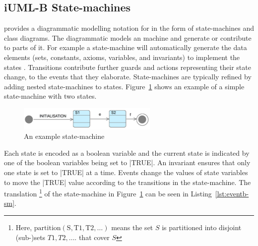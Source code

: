 
\subsection{iUML-B State-machines}
\label{sec:iumlb}

\iUMLB provides a diagrammatic modelling notation for \EventB in the form of state-machines and class diagrams. 
The diagrammatic models  an \EventB machine and generate or contribute to parts of it. 
For example a state-machine will automatically generate the \EventB data elements (sets, constants, axioms, variables, and invariants) to implement the states . 
Transitions contribute further guards and actions representing their state change, to the events that they elaborate.  
State-machines are typically refined by adding nested state-machines to states.
Figure~\ref{fig:iumlb-sm} shows an example of a simple state-machine with two states.
\begin{figure}[!h]
	\vspace{-.5cm}
	\centering
	\includegraphics[width=0.6\textwidth]{figures/iumlb-SM}
	\caption{An example \iUMLB state-machine}
	\label{fig:iumlb-sm}
	\vspace{-.5cm}
\end{figure}

Each state is encoded as a boolean variable and the current state is indicated by one of the boolean variables being set to |TRUE|. 
An invariant ensures that only one state is set to |TRUE| at a time.
Events change the values of state variables to move the |TRUE| value according to the transitions in the state-machine.  
The \EventB translation%
%
\footnote{%
  Here, $\mathrm{partition(S, T1, T2, \ldots)}$ means the set $S$ is partitioned into disjoint (sub-)sets $T1, T2, \ldots$.
that cover $S$} 
of the state-machine in Figure~\ref{fig:iumlb-sm} can be seen in Listing~\ref{lst:eventb-sm}.
\iUMLB {} 
\SCXML {}
	
